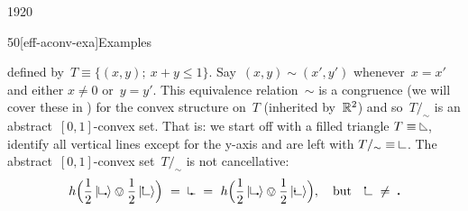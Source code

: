 \begin{parsec}{1920}
\begin{point}{50}[eff-aconv-exa]{Examples}
\begin{enumerate}
    defined by~$T \equiv \{ (x,y);\ x+y \leq 1\}$.
Say~$(x,y) \sim (x',y')$
    whenever~$x = x'$ and either $x\neq 0$ or~$y=y'$.
This equivalence relation~$\sim$
is a congruence (we will cover these in )
        for the convex structure on~$T$
    (inherited by~$\mathbb{R}^2$)
    and so~$T /_\sim$ is an abstract~$[0,1]$-convex set.
That is: we start off with a filled triangle
$T \equiv \begin{tikzpicture}[scale=0.2]
    \draw (0,0) -- (0,1) ; 
    \draw (1,0) -- (0,0) ; 
    \draw (1,0) -- (0,1) ; 
\end{tikzpicture}$,
identify all vertical lines
except for the y-axis
and are left with
$T/_\sim \equiv
\begin{tikzpicture}[scale=0.2]
    \draw (0,0) -- (0,1) ; 
    \draw (1,0) -- (0,0) ; 
\end{tikzpicture}$.
The abstract~$[0,1]$-convex set~$T/_\sim$
    is not cancellative:
\begin{equation*}
    h\Bigl( 
    \frac{1}{2}\ket{\begin{tikzpicture}[scale=0.2]
    \filldraw( 1,0) circle (3pt);
    \draw (0,0) -- (0,1) ; 
    \draw (1,0) -- (0,0) ; 
\end{tikzpicture}}
\ovee
    \frac{1}{2}\ket{\begin{tikzpicture}[scale=0.2]
    \filldraw( 0,1) circle (3pt);
    \draw (0,0) -- (0,1) ; 
    \draw (1,0) -- (0,0) ; 
\end{tikzpicture}} \Bigr)
\ = \
    \begin{tikzpicture}[scale=0.2]
    \filldraw( .5,0) circle (3pt);
    \draw (0,0) -- (0,1) ; 
    \draw (1,0) -- (0,0) ; 
\end{tikzpicture}
\ = \ 
h \Bigl(\frac{1}{2}\ket{\begin{tikzpicture}[scale=0.2]
    \filldraw( 1,0) circle (3pt);
    \draw (0,0) -- (0,1) ; 
    \draw (1,0) -- (0,0) ; 
\end{tikzpicture}}
\ovee
    \frac{1}{2}\ket{
        \begin{tikzpicture}[scale=0.2]
    \filldraw( 0,.5) circle (3pt);
    \draw (0,0) -- (0,1) ; 
    \draw (1,0) -- (0,0) ; 
\end{tikzpicture}
}\Bigr), \quad\text{but}\quad
        \begin{tikzpicture}[scale=0.2]
    \filldraw( 0,1) circle (3pt);
    \draw (0,0) -- (0,1) ; 
    \draw (1,0) -- (0,0) ; 
\end{tikzpicture} \ \neq \ 
        \begin{tikzpicture}[scale=0.2]
    \filldraw( 0,.5) circle (3pt);

\end{tikzpicture}
\end{equation*}
\end{enumerate}
\end{point}
\end{parsec}
